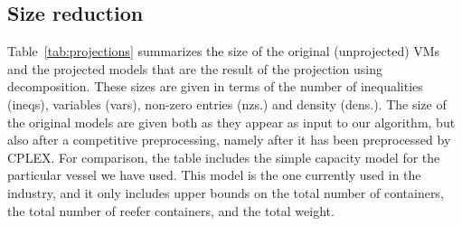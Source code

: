\subsection{Size reduction}
Table~\ref{tab:projections} summarizes the size of the original (unprojected) VMs and the projected models that are the result of the projection using decomposition. These sizes are given in terms of the number of inequalities (ineqs), variables (vars), non-zero entries (nzs.) and density (dens.). The size of the original models are given both as they appear as input to our algorithm, but also after a {competitive} preprocessing, namely after it has been preprocessed by CPLEX. For comparison, the table includes the simple capacity model for the particular vessel we have used. This model is the one currently used in the industry, and it only includes upper bounds on the total number of containers, the total number of reefer containers, and the total weight.  

